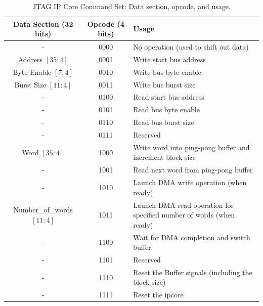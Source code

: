 \documentclass[a4paper,11pt,oneside]{report}
\begin{document}
\begin{table}[h!]
    \centering
    \begin{tabular}{|c|c|p{8cm}|}
        \hline
        \textbf{Data Section (32 bits)} & \textbf{Opcode (4 bits)} & \textbf{Usage} \\
        \hline
        -                               & 0000                     & No operation (used to shift out data) \\
        Address $[35:4]$                & 0001                     & Write start bus address \\
        Byte Enable $[7:4]$             & 0010                     & Write bus byte enable \\
        Burst Size $[11:4]$             & 0011                     & Write bus burst size \\
        -                               & 0100                     & Read start bus address \\
        -                               & 0101                     & Read bus byte enable \\
        -                               & 0110                     & Read bus burst size \\
        -                               & 0111                     & Reserved \\
        Word $[35:4]$                   & 1000                     & Write word into ping-pong buffer and increment block size \\
        -                               & 1001                     & Read next word from ping-pong buffer \\
        -                               & 1010                     & Launch DMA write operation (when ready) \\
        Number\_of\_words $[11:4]$      & 1011                     & Launch DMA read operation for specified number of words (when ready) \\
        -                               & 1100                     & Wait for DMA completion and switch buffer \\
        -                               & 1101                     & Reserved \\
        -                               & 1110                     & Reset the Buffer signals (including the block size) \\
        -                               & 1111                     & Reset the ipcore \\
        \hline
    \end{tabular}
    \caption{JTAG IP Core Command Set: Data section, opcode, and usage.}

\end{table}
\end{document}
